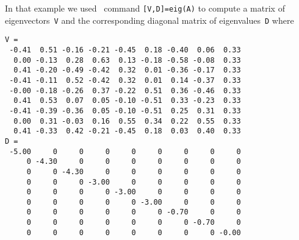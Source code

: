 \begin{example}
\begin{solution} 
In that example we used \script\ command \verb|[V,D]=eig(A)| to compute a matrix of eigenvectors~\verb|V| and the corresponding diagonal matrix of eigenvalues~\verb|D| where \twodp
\begin{verbatim}
V =
 -0.41  0.51 -0.16 -0.21 -0.45  0.18 -0.40  0.06  0.33
  0.00 -0.13  0.28  0.63  0.13 -0.18 -0.58 -0.08  0.33
  0.41 -0.20 -0.49 -0.42  0.32  0.01 -0.36 -0.17  0.33
 -0.41 -0.11  0.52 -0.42  0.32  0.01  0.14 -0.37  0.33
 -0.00 -0.18 -0.26  0.37 -0.22  0.51  0.36 -0.46  0.33
  0.41  0.53  0.07  0.05 -0.10 -0.51  0.33 -0.23  0.33
 -0.41 -0.39 -0.36  0.05 -0.10 -0.51  0.25  0.31  0.33
  0.00  0.31 -0.03  0.16  0.55  0.34  0.22  0.55  0.33
  0.41 -0.33  0.42 -0.21 -0.45  0.18  0.03  0.40  0.33
D =
 -5.00     0     0     0     0     0     0     0     0
     0 -4.30     0     0     0     0     0     0     0
     0     0 -4.30     0     0     0     0     0     0
     0     0     0 -3.00     0     0     0     0     0
     0     0     0     0 -3.00     0     0     0     0
     0     0     0     0     0 -3.00     0     0     0
     0     0     0     0     0     0 -0.70     0     0
     0     0     0     0     0     0     0 -0.70     0
     0     0     0     0     0     0     0     0 -0.00
\end{verbatim}

\end{solution}
\end{example}
